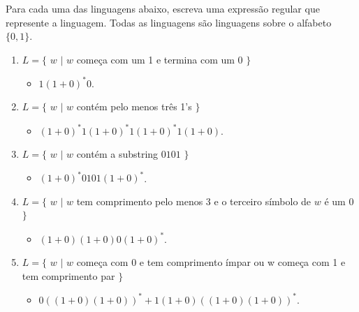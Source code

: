 \documentclass[a4paper, 12pt]{article}
\begin{document}
Para cada uma das linguagens abaixo, escreva uma expressão regular que represente a linguagem. Todas as linguagens são linguagens sobre o alfabeto $\{0, 1\}$.

\begin{enumerate}
    \item $L = \{$ $w$ $|$ $w$ começa com um 1 e termina com um 0 $\}$
    \begin{itemize}
        \item $1(1+0)^*0$.
    \end{itemize}
    
    \item $L = \{$ $w$ $|$ $w$ contém pelo menos três 1's $\}$
    \begin{itemize}
        \item $(1+0)^*1(1+0)^*1(1+0)^*1(1+0)$.
    \end{itemize}
    
    \item $L = \{$ $w$ $|$ $w$ contém a substring $0101$ $\}$
    \begin{itemize}
        \item $(1+0)^*0101(1+0)^*$.
    \end{itemize}
    
    \item $L = \{$ $w$ $|$ $w$ tem comprimento pelo menos 3 e o terceiro símbolo de $w$ é um 0 $\}$
    \begin{itemize}
        \item $(1+0)(1+0)0(1+0)^*$.
    \end{itemize}
    
    \item $L = \{$ $w$ $|$ $w$ começa com 0 e tem comprimento ímpar ou w começa com 1 e tem comprimento par $\}$
    \begin{itemize}
        \item $0((1+0)(1+0))^* + 1(1+0)((1+0)(1+0))^*$.
    \end{itemize}
    
\end{enumerate}
\end{document}
